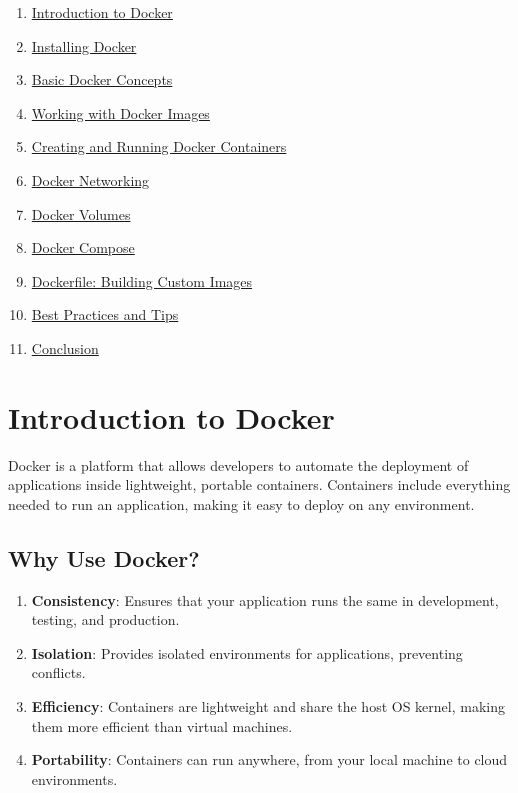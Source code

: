 \documentclass[
  letterpaper,
  DIV=11,
  numbers=noendperiod]{scrreprt}
\providecommand{\tightlist}{%
  \setlength{\itemsep}{0pt}\setlength{\parskip}{0pt}}\usepackage{longtable,booktabs,array}
\begin{document}
\begin{enumerate}
\def\labelenumi{\arabic{enumi}.}
\tightlist
\item
  \hyperref[introduction-to-docker]{Introduction to Docker}
\item
  \hyperref[installing-docker]{Installing Docker}
\item
  \hyperref[basic-docker-concepts]{Basic Docker Concepts}
\item
  \hyperref[working-with-docker-images]{Working with Docker Images}
\item
  \hyperref[creating-and-running-docker-containers]{Creating and Running
  Docker Containers}
\item
  \hyperref[docker-networking]{Docker Networking}
\item
  \hyperref[docker-volumes]{Docker Volumes}
\item
  \hyperref[docker-compose]{Docker Compose}
\item
  \hyperref[dockerfile-building-custom-images]{Dockerfile: Building
  Custom Images}
\item
  \hyperref[best-practices-and-tips]{Best Practices and Tips}
\item
  \hyperref[conclusion]{Conclusion}
\end{enumerate}

\section{Introduction to Docker}\label{introduction-to-docker}

Docker is a platform that allows developers to automate the deployment
of applications inside lightweight, portable containers. Containers
include everything needed to run an application, making it easy to
deploy on any environment.

\subsection{Why Use Docker?}\label{why-use-docker}

\begin{enumerate}
\def\labelenumi{\arabic{enumi}.}
\tightlist
\item
  \textbf{Consistency}: Ensures that your application runs the same in
  development, testing, and production.
\item
  \textbf{Isolation}: Provides isolated environments for applications,
  preventing conflicts.
\item
  \textbf{Efficiency}: Containers are lightweight and share the host OS
  kernel, making them more efficient than virtual machines.
\item
  \textbf{Portability}: Containers can run anywhere, from your local
  machine to cloud environments.
\end{enumerate}
\end{document}
